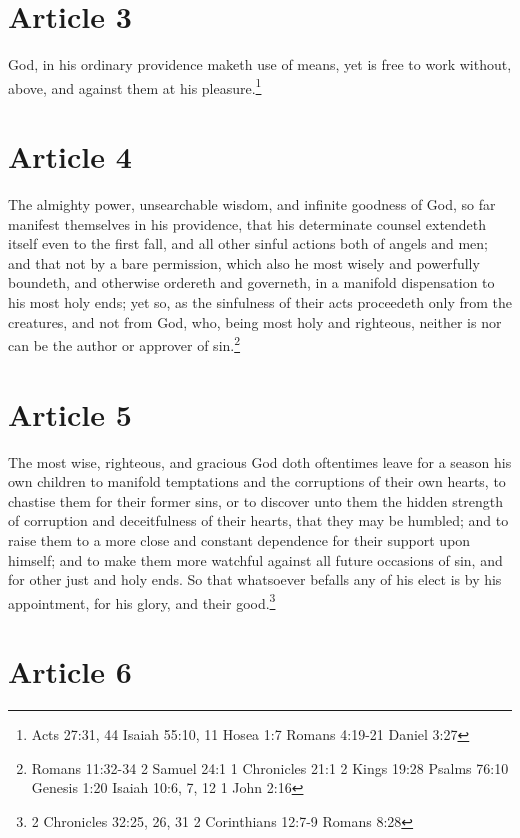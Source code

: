 \documentclass[12pt,letterpaper]{book}
\begin{document}
\section{Article 3}

God, in his ordinary providence maketh use of means, yet is free to work without, above, and against them at his pleasure.\footnote{Acts 27:31, 44 Isaiah 55:10, 11 Hosea 1:7 Romans 4:19-21 Daniel 3:27}

\section{Article 4}

The almighty power, unsearchable wisdom, and infinite goodness of God, so far manifest themselves in his providence, that his determinate counsel extendeth itself even to the first fall, and all other sinful actions both of angels and men; and that not by a bare permission, which also he most wisely and powerfully boundeth, and otherwise ordereth and governeth, in a manifold dispensation to his most holy ends; yet so, as the sinfulness of their acts proceedeth only from the creatures, and not from God, who, being most holy and righteous, neither is nor can be the author or approver of sin.\footnote{Romans 11:32-34 2 Samuel 24:1 1 Chronicles 21:1 2 Kings 19:28 Psalms 76:10 Genesis 1:20 Isaiah 10:6, 7, 12 1 John 2:16}

\section{Article 5}

The most wise, righteous, and gracious God doth oftentimes leave for a season his own children to manifold temptations and the corruptions of their own hearts, to chastise them for their former sins, or to discover unto them the hidden strength of corruption and deceitfulness of their hearts, that they may be humbled; and to raise them to a more close and constant dependence for their support upon himself; and to make them more watchful against all future occasions of sin, and for other just and holy ends. So that whatsoever befalls any of his elect is by his appointment, for his glory, and their good.\footnote{2 Chronicles 32:25, 26, 31 2 Corinthians 12:7-9 Romans 8:28}

\section{Article 6}
\end{document}
